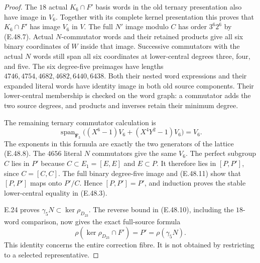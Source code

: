 \begin{proof}
The $18$ actual $K_6\cap F'$ basis words in the old ternary
presentation also have image in $V_6$.
Together with its complete kernel presentation this proves
that $K_6\cap F'$ has image $V_6$ in $V$.
The full $N'$ image modulo $C$ has order $3^6 2^6$ by
\textup{(E.48.7)}.
Actual $N$-commutator words and their retained products give
all six binary coordinates of $W$ inside that image.
Successive commutators with the actual $N$ words still span
all six coordinates at lower-central degrees three, four,
and five.
The six degree-five preimages have lengths
$4746,4754,4682,4682,6440,6438$.
Both their nested word expressions and their expanded literal
words have identity image in both old source components.
Their lower-central membership is checked on the word graph:
a commutator adds the two source degrees, and products and
inverses retain their minimum degree.

The remaining ternary commutator calculation is
\[
 \operatorname{span}_{\mathbf F_3}
 \bigl((X^6-1)V_6+(X^4Y^2-1)V_6\bigr)=V_6.
 \tag{E.48.11}
\]
The exponents in this formula are exactly the two generators
of the lattice \textup{(E.48.8)}.
The $4656$ literal $N$ commutators give the same $V_6$.
The perfect subgroup $C$ lies in $P'$ because
$C\subset E_1=[E,E]$ and $E\subset P$.
It therefore lies in $[P,P']$, since $C=[C,C]$.
The full binary degree-five image and
\textup{(E.48.11)} show that $[P,P']$ maps onto
$P'/C$.
Hence $[P,P']=P'$, and induction proves the stable
lower-central equality in \textup{(E.48.3)}.

E.24 proves $\gamma_5N\subset\ker\rho_{D_{23}}$.
The reverse bound in \textup{(E.48.10)}, including the
$18$-word comparison, now gives the exact full-source formula
\[
 \rho(\ker\rho_{D_{23}}\cap F')
     =P'=\rho(\gamma_5N).
 \tag{E.48.12}
\]
This identity concerns the entire correction fibre.
It is not obtained by restricting to a selected representative.


\end{proof}
